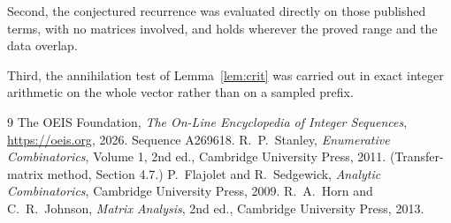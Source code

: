 \documentclass[11pt,a4paper]{article}
\theoremstyle{plain}
\theoremstyle{definition}
\begin{document}
Second, the conjectured recurrence was evaluated directly on those published terms, with no
matrices involved, and holds wherever the proved range and the data overlap.

Third, the annihilation test of Lemma~\ref{lem:crit} was carried out in exact integer
arithmetic on the whole vector rather than on a sampled prefix.

\begin{thebibliography}{9}
 The OEIS Foundation, \emph{The On-Line Encyclopedia of Integer
Sequences}, \url{https://oeis.org}, 2026. Sequence A269618.
 R.~P.~Stanley, \emph{Enumerative Combinatorics}, Volume 1, 2nd ed.,
Cambridge University Press, 2011. (Transfer-matrix method, Section 4.7.)
 P.~Flajolet and R.~Sedgewick, \emph{Analytic Combinatorics}, Cambridge
University Press, 2009.
 R.~A.~Horn and C.~R.~Johnson, \emph{Matrix Analysis}, 2nd ed., Cambridge
University Press, 2013.
\end{thebibliography}
\end{document}
